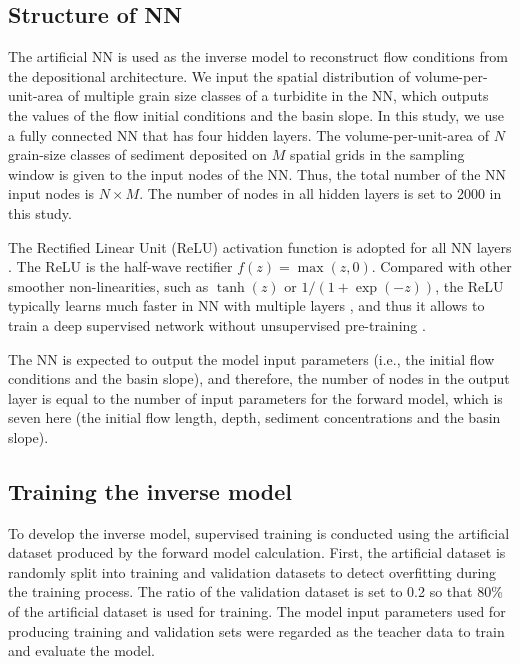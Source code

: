 \subsection{Structure of NN}
The artificial NN is used as the inverse model to reconstruct flow conditions from the depositional architecture. We input the spatial distribution of volume-per-unit-area of multiple grain size classes of a turbidite in the NN, which outputs the values of the flow initial conditions and the basin slope. In this study, we use a fully connected NN that has four hidden layers. The volume-per-unit-area of $N$ grain-size classes of sediment deposited on $M$ spatial grids in the sampling window is given to the input nodes of the NN. Thus, the total number of the NN input nodes is $N \times M$. The number of nodes in all hidden layers is set to 2000 in this study. 

The Rectified Linear Unit (ReLU) activation function is adopted for all NN layers \citep{Nair2010, Glorot2011}. The ReLU is the half-wave rectifier $f(z) = \max(z, 0)$. Compared with other smoother non-linearities, such as $\tanh(z)$ or $1/(1+\exp(-z))$, the ReLU typically learns much faster in NN with multiple layers \citep{Glorot2011}, and thus it allows to train a deep supervised network without unsupervised pre-training \citep{LeCun2015}.

The NN is expected to output the model input parameters (i.e., the initial flow conditions and the basin slope), and therefore, the number of nodes in the output layer is equal to the number of input parameters for the forward model, which is seven here (the initial flow length, depth, sediment concentrations and the basin slope).

\subsection{Training the inverse model}
To develop the inverse model, supervised training is conducted using the artificial dataset produced by the forward model calculation. First, the artificial dataset is randomly split into training and validation datasets to detect overfitting during the training process. The ratio of the validation dataset is set to 0.2 so that 80\% of the artificial dataset is used for training. The model input parameters used for producing training and validation sets were regarded as the teacher data to train and evaluate the model.

